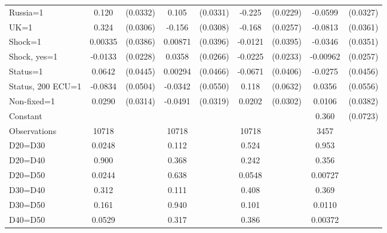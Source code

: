 \begin{tabular}{l|cccccc|cc}
Russia=1        &    0.120\sym{***}& (0.0332)&    0.105\sym{***}& (0.0331)&   -0.225\sym{***}& (0.0229)&  -0.0599\sym{*}  & (0.0327)\\
UK=1            &    0.324\sym{***}& (0.0306)&   -0.156\sym{***}& (0.0308)&   -0.168\sym{***}& (0.0257)&  -0.0813\sym{**} & (0.0361)\\
Shock=1         &  0.00335         & (0.0386)&  0.00871         & (0.0396)&  -0.0121         & (0.0395)&  -0.0346         & (0.0351)\\
Shock, yes=1    &  -0.0133         & (0.0228)&   0.0358         & (0.0266)&  -0.0225         & (0.0233)& -0.00962         & (0.0257)\\
Status=1        &   0.0642         & (0.0445)&  0.00294         & (0.0466)&  -0.0671\sym{*}  & (0.0406)&  -0.0275         & (0.0456)\\
Status, 200 ECU=1&  -0.0834\sym{*}  & (0.0504)&  -0.0342         & (0.0550)&    0.118\sym{*}  & (0.0632)&   0.0356         & (0.0556)\\
Non-fixed=1     &   0.0290         & (0.0314)&  -0.0491         & (0.0319)&   0.0202         & (0.0302)&   0.0106         & (0.0382)\\
Constant        &                  &         &                  &         &                  &         &    0.360\sym{***}& (0.0723)\\
\hline
Observations    &    10718         &         &    10718         &         &    10718         &         &     3457         &         \\
D20=D30         &   0.0248         &         &    0.112         &         &    0.524         &         &    0.953         &         \\
D20=D40         &    0.900         &         &    0.368         &         &    0.242         &         &    0.356         &         \\
D20=D50         &   0.0244         &         &    0.638         &         &   0.0548         &         &  0.00727         &         \\
D30=D40         &    0.312         &         &    0.111         &         &    0.408         &         &    0.369         &         \\
D30=D50         &    0.161         &         &    0.940         &         &    0.101         &         &   0.0110         &         \\
D40=D50         &   0.0529         &         &    0.317         &         &    0.386         &         &  0.00372         &         \\

\end{tabular}
